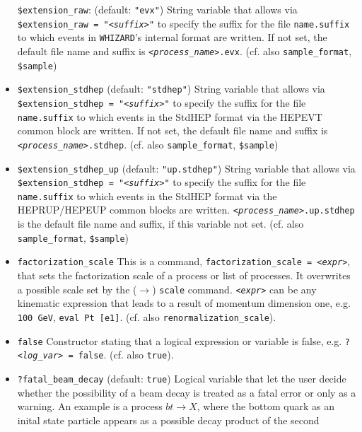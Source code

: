 \documentclass[12pt]{book}
\newcommand{\ttt}[1]{\texttt{#1}}
\newcommand{\whizard}{\texttt{WHIZARD}}
\begin{document}
\begin{itemize}
\ttt{\$extension\_raw}: \qquad (default: \ttt{"evx"}) \newline
String variable that allows via \ttt{\$extension\_raw = "{\em <suffix>}"} to 
specify the suffix for the file \ttt{name.suffix} to which events in
\whizard's internal format are written. If not set, the default file
name and suffix is \ttt{{\em <process\_name>}.evx}. (cf. also \ttt{sample\_format},
\ttt{\$sample})  
\item
\ttt{\$extension\_stdhep} \qquad (default: \ttt{"stdhep"}) \newline
String variable that allows via \ttt{\$extension\_stdhep = "{\em <suffix>}"} to 
specify the suffix for the file \ttt{name.suffix} to which events in
the StdHEP format via the HEPEVT common block are written. If not set,
the default file name and suffix is
\ttt{{\em <process\_name>}.stdhep}. (cf. also \ttt{sample\_format},
\ttt{\$sample})   
\item
\ttt{\$extension\_stdhep\_up} \qquad (default: \ttt{"up.stdhep"}) \newline
String variable that allows via \ttt{\$extension\_stdhep = "{\em <suffix>}"} to 
specify the suffix for the file \ttt{name.suffix} to which events in
the StdHEP format via the HEPRUP/HEPEUP common blocks are
written. \ttt{{\em <process\_name>}.up.stdhep} is the default file name and
suffix, if this variable not set. (cf. also \ttt{sample\_format},
\ttt{\$sample})
\item
\ttt{factorization\_scale} \newline
This is a command, \ttt{factorization\_scale = {\em <expr>}}, that sets
the factorization scale of a process or list of processes. It
overwrites a possible scale set by the ($\to$) \ttt{scale} command. 
\ttt{{\em <expr>}} can be any kinematic expression that leads to a result of
momentum dimension one, e.g. \ttt{100 GeV}, \ttt{eval
Pt [e1]}. (cf. also \ttt{renormalization\_scale}). 
\item
\ttt{false} \newline
Constructor stating that a logical expression or variable is false,
e.g. \ttt{?{\em <log\_var>} = false}. (cf. also \ttt{true}).
\item
\ttt{?fatal\_beam\_decay} \qquad (default: \ttt{true}) \newline
Logical variable that let the user decide whether the possibility of a
beam decay is treated as a fatal error or only as a warning. An
example is a process $b t \to X$, where the bottom quark as an inital
state particle appears as a possible decay product of the second

\end{itemize}
\end{document}
